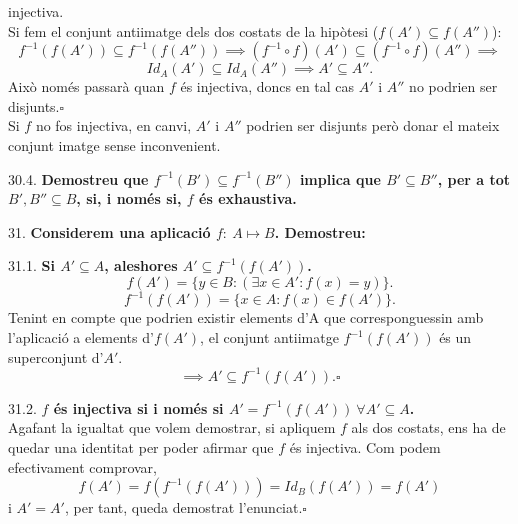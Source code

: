 \documentclass[11pt]{article}
\begin{document}
\begin{legal}[start=21]
\begin{legal}
{injectiva.}\\
		Si fem el conjunt antiimatge dels dos costats de la hipòtesi ($f(A')\subseteq f(A'')$):
		$$f^{-1}(f(A'))\subseteq f^{-1}(f(A''))\implies (f^{-1}\circ f)(A')\subseteq (f^{-1}\circ f)(A'')\implies$$
		$$Id_A(A')\subseteq Id_A(A'')\implies A'\subseteq A''.$$
		Això només passarà quan $f$ és injectiva, doncs en tal cas $A'$ i $A''$ no podrien ser disjunts.$\square$\\Si $f$ no fos injectiva, en canvi, $A'$ i $A''$ podrien ser disjunts però donar el mateix conjunt imatge sense inconvenient.
		\item[30.4.] \textbf{Demostreu que $f^{-1}(B')\subseteq f^{-1}(B'')$ implica que $B'\subseteq B''$, per a tot $B',B''\subseteq B$, si, i només si, $f$ és exhaustiva.}
	\end{legal}
	\item[31.] \textbf{Considerem una aplicació $f: \ A\mapsto B$. Demostreu:}
	\begin{legal}
		\item[31.1.] \textbf{Si $A'\subseteq A$, aleshores $A'\subseteq f^{-1}(f(A'))$.}
		$$f(A')=\{y\in B:(\exists x\in A':f(x)=y)\}.$$
		$$f^{-1}(f(A'))=\{x\in A:f(x)\in f(A')\}.$$
		Tenint en compte que podrien existir elements d'A que corresponguessin amb l'aplicació a elements d'$f(A')$, el conjunt antiimatge $f^{-1}(f(A'))$ és un superconjunt d'$A'$.
		$$\implies A'\subseteq f^{-1}(f(A')).\square$$
		\item[31.2.] \textbf{$f$ és injectiva si i només si $A'=f^{-1}(f(A')) \ \forall A'\subseteq A$.}\\
		Agafant la igualtat que volem demostrar, si apliquem $f$ als dos costats, ens ha de quedar una identitat per poder afirmar que $f$ és injectiva. Com podem efectivament comprovar,
		$$f(A')=f(f^{-1}(f(A')))=Id_B(f(A'))=f(A')$$i $A'=A'$, per tant, queda demostrat l'enunciat.$\square$
	\end{legal}
\end{legal}

\newpage
\end{document}
